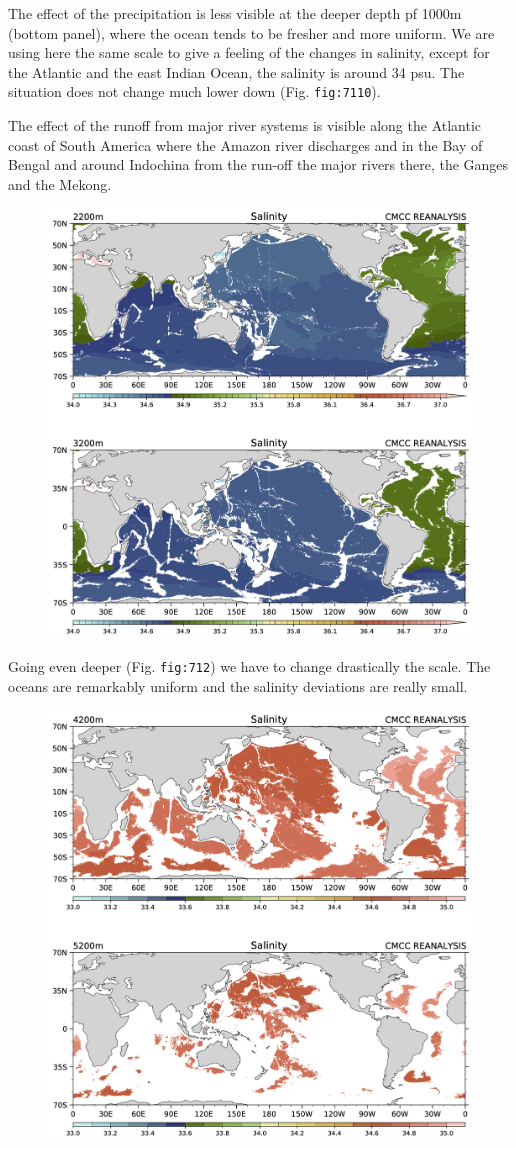 The effect of the precipitation is less visible at the deeper depth pf
1000m (bottom panel), where the ocean tends to be fresher and more
uniform. We are using here the same scale to give a feeling of the
changes in salinity, except for the Atlantic and the east Indian Ocean,
the salinity is around 34 psu. The situation does not change much lower
down (Fig. \texttt{fig:7110}).

The effect of the runoff from major river systems is visible along the
Atlantic coast of South America where the Amazon river discharges and in
the Bay of Bengal and around Indochina from the run-off the major rivers
there, the Ganges and the Mekong.

\begin{figure}
\centering
\includegraphics[width = .7 \textwidth]{figs/GD/Sal2200-3200.png}
\caption{} \label{fig:}
\end{figure}

Going even deeper (Fig. \texttt{fig:712}) we have to change drastically
the scale. The oceans are remarkably uniform and the salinity deviations
are really small.

\begin{figure}
\centering
\includegraphics[width = .7 \textwidth]{figs/GD/Sal4200-5200.png}
\caption{} \label{fig:}
\end{figure}

